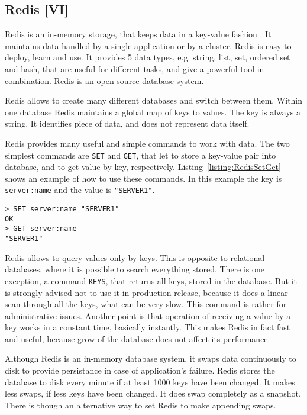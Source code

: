 \subsection{Redis [VI]}

Redis is an in-memory storage, that keeps data in a key-value fashion \cite{Seguin2012, Redis}.
It maintains data handled by a single application or by a cluster.
Redis is easy to deploy, learn and use.
It provides 5 data types, e.g. string, list, set, ordered set and hash, that are useful for different tasks, and give a powerful tool in combination.
Redis is an open source database system.


Redis allows to create many different databases and switch between them.
Within one database Redis maintains a global map of keys to values.
The key is always a string.
It identifies piece of data, and does not represent data itself.

Redis provides many useful and simple commands to work with data.
The two simplest commands are \lstinline{SET} and \lstinline{GET}, that let to store a key-value pair into database, and to get value by key, respectively.
Listing~\ref{listing:RedisSetGet} shows an example of how to use these commands.
In this example the key is \lstinline{server:name} and the value is \lstinline{"SERVER1"}.

\begin{lstlisting}[float=h, caption=Example of usage of commands SET and GET., label=listing:RedisSetGet]
> SET server:name "SERVER1"
OK
> GET server:name
"SERVER1"
\end{lstlisting}

Redis allows to query values only by keys.
This is opposite to relational databases, where it is possible to search everything stored.
There is one exception, a command \lstinline{KEYS}, that returns all keys, stored in the database.
But it is strongly advised not to use it in production release, because it does a linear scan through all the keys, what can be very slow.
This command is rather for administrative issues.
Another point is that operation of receiving a value by a key works in a constant time, basically instantly.
This makes Redis in fact fast and useful, because grow of the database does not affect its performance.

Although Redis is an in-memory database system, it swaps data continuously to disk to provide persistance in case of application's failure.
Redis stores the database to disk every minute if at least 1000 keys have been changed.
It makes less swaps, if less keys have been changed.
It does swap completely as a snapshot.
There is though an alternative way to set Redis to make appending swaps.

